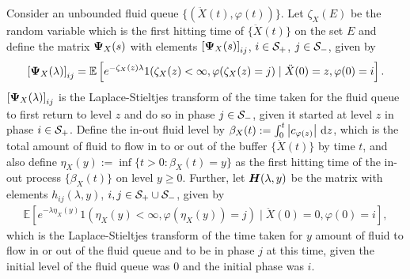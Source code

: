 Consider an unbounded fluid queue \(\{(\ddot X(t), \varphi(t))\}\). Let \(\zeta_X(E)\) be the random variable which is the first hitting time of \(\{\ddot X(t)\}\) on the set \(E\) and define the matrix \(\boldsymbol \Psi_X(s)\) with elements \(\left[\boldsymbol \Psi_X(s)\right]_{ij}\), \(i\in\mathcal{S}_+\), \(j\in\mathcal{S}_-\), given by
\begin{align}
	\left[\boldsymbol \Psi_X(\lambda)\right]_{ij} = \mathbb E\left[ e^{-\zeta_X(z)\lambda} 1(\zeta_X(z)<\infty, \varphi(\zeta_X(z)=j)\mid \ddot X(0)=z, \varphi(0)=i\right].
\end{align}
\(\left[\boldsymbol \Psi_X(\lambda)\right]_{ij}\) is the Laplace-Stieltjes transform of the time taken for the fluid queue to first return to level \(z\) and do so in phase \(j\in\mathcal{S}_-\), given it started at level \(z\) in phase \(i\in\mathcal{S}_+\). Define the in-out fluid level by $\beta_X(t) := \int_0^t \left| c_{\varphi(z)} \right|  \, \mathrm{d} z$, which is the total amount of fluid to flow in to or out of the buffer \(\{\ddot X(t)\}\) by time \(t\), and also define $\eta_X(y) := \inf \{t > 0: \beta_X(t) = y\}$ as the first hitting time of the in-out process \(\{\beta_X(t)\}\) on level \(y\geq 0\). Further, let \(\boldsymbol H(\lambda,y)\) be the matrix with elements \(h_{ij}(\lambda,y)\), \(i,j\in\mathcal{S}_+\cup\mathcal{S}_-\), given by
\begin{align}
	\mathbb E\left[e^{-\lambda \eta_X(y)}1(\eta_X(y)<\infty,\varphi(\eta_X(y))=j)\mid \ddot X(0)=0, \varphi(0)=i\right],
\end{align}
which is the Laplace-Stieltjes transform of the time taken for \(y\) amount of fluid to flow in or out of the fluid queue and to be in phase \(j\) at this time, given the initial level of the fluid queue was \(0\) and the initial phase was \(i\). 

